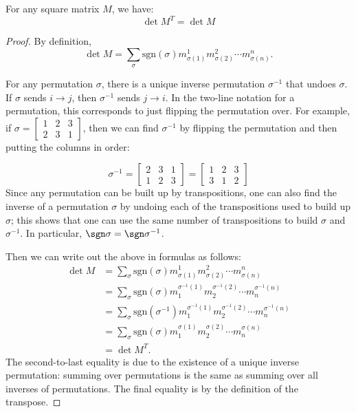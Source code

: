 \begin{theorem}
For any square matrix $M$, we have:
\[
\det M^T = \det M
\]
\end{theorem}
\begin{proof}
  By definition, \[
\det M = \sum_{\sigma} \text{sgn}(\sigma) m^1_{\sigma(1)}m^2_{\sigma(2)}\cdots m^n_{\sigma(n)}.
\]

For any permutation $\sigma$, there is a unique inverse permutation $\sigma^{-1}$ that undoes $\sigma$.  If $\sigma$ sends $i\rightarrow j$, then $\sigma^{-1}$ sends $j\rightarrow i$.  In the two-line notation for a permutation, this corresponds to just flipping the permutation over.  For example, if $\sigma=\begin{bmatrix} 
1 & 2 & 3 \\
2 & 3 & 1
\end{bmatrix}$, then we can find $\sigma^{-1}$ by flipping the permutation and then putting the columns in order:

\[
\sigma^{-1}=\begin{bmatrix} 
2 & 3 & 1 \\
1 & 2 & 3
\end{bmatrix}=\begin{bmatrix} 
1 & 2 & 3 \\
3 & 1 & 2
\end{bmatrix}
\]
Since any permutation can be built up by transpositions, one can also find the inverse of a permutation $\sigma$ by undoing each of the transpositions used to build up $\sigma$; this shows that one can use the same number of transpositions to build $\sigma$ and $\sigma^{-1}$.  In particular, $\sgn \sigma= \sgn \sigma^{-1}$.


Then we can write out the above in formulas as follows:
\begin{align*}
\det M &= \sum_{\sigma} \text{sgn}(\sigma) m^1_{\sigma(1)}m^2_{\sigma(2)}\cdots m^n_{\sigma(n)} \\
&=\sum_{\sigma} \text{sgn}(\sigma) m_1^{\sigma^{-1}(1)}m_2^{\sigma^{-1}(2)}\cdots m_n^{\sigma^{-1}(n)} \\
&=\sum_{\sigma} \text{sgn}(\sigma^{-1}) m_1^{\sigma^{-1}(1)}m_2^{\sigma^{-1}(2)}\cdots m_n^{\sigma^{-1}(n)} \\
&= \sum_{\sigma} \text{sgn}(\sigma) m_1^{\sigma(1)}m_2^{\sigma(2)}\cdots m_n^{\sigma(n)} \\
&= \det M^T.
\end{align*}
The second-to-last equality is due to the existence of a unique inverse permutation: summing over permutations is the same as summing over all inverses of permutations.  The final equality is by the definition of the transpose.
\end{proof}

